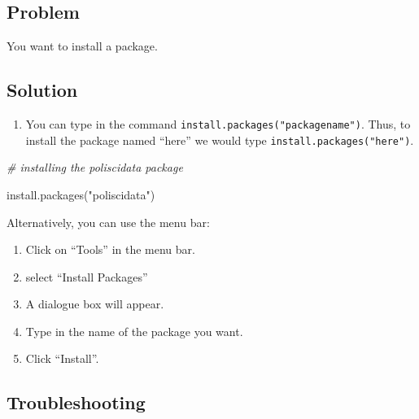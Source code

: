 \documentclass[
]{book}
\newenvironment{Shaded}{\begin{snugshade}}{\end{snugshade}}
\newcommand{\CommentTok}[1]{\textcolor[rgb]{0.56,0.35,0.01}{\textit{#1}}}
\newcommand{\FunctionTok}[1]{\textcolor[rgb]{0.00,0.00,0.00}{#1}}
\newcommand{\NormalTok}[1]{#1}
\newcommand{\StringTok}[1]{\textcolor[rgb]{0.31,0.60,0.02}{#1}}
\providecommand{\tightlist}{%
  \setlength{\itemsep}{0pt}\setlength{\parskip}{0pt}}
\begin{document}
\hypertarget{problem-6}{%
\subsection{Problem}\label{problem-6}}

You want to install a package.

\hypertarget{solution-6}{%
\subsection{Solution}\label{solution-6}}

\begin{enumerate}
\def\labelenumi{\arabic{enumi}.}
\tightlist
\item
  You can type in the command \texttt{install.packages("packagename")}. Thus, to install the package named ``here'' we would type \texttt{install.packages("here")}.
\end{enumerate}

\begin{Shaded}
\begin{Highlighting}[]
\CommentTok{\# installing the poliscidata package}

\FunctionTok{install.packages}\NormalTok{(}\StringTok{"poliscidata"}\NormalTok{)}
\end{Highlighting}
\end{Shaded}

Alternatively, you can use the menu bar:

\begin{enumerate}
\def\labelenumi{\arabic{enumi}.}
\tightlist
\item
  Click on ``Tools'' in the menu bar.
\item
  select ``Install Packages''
\item
  A dialogue box will appear.
\item
  Type in the name of the package you want.
\item
  Click ``Install''.
\end{enumerate}

\hypertarget{troubleshooting-4}{%
\subsection{Troubleshooting}\label{troubleshooting-4}}
\end{document}
